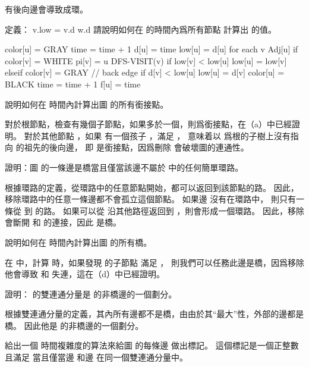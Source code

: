 \startANSWER
有後向邊會導致成環。
\stopANSWER

\startigBase[continue]\startitem
定義：
\startformula
v.low = \min \startcases
\NC v.d \MC \NR
\NC w.d \MC{}\NR
\stopcases
\stopformula
請說明如何在  的時間內爲所有節點  計算出  的值。
\stopitem\stopigBase

\startANSWER
{}
\startCLRS
color[u] = GRAY
time = time + 1
d[u] = time
low[u] = d[u]
for each v Adj[u]
	if color[v] = WHITE
		pi[v] = u
		DFS-VISIT(v)
		if low[v] < low[u]
			low[u] = low[v]
	elseif color[v] = GRAY		// back edge
		if d[v] < low[u]
			low[u] = d[v]
color[u] = BLACK
time = time + 1
f[u] = time
\stopCLRS
\stopANSWER

\startigBase[continue]\startitem
說明如何在  時間內計算出圖  的所有銜接點。
\stopitem\stopigBase

\startANSWER
對於根節點，檢查有幾個子節點，如果多於一個，則爲銜接點，在（a）中已經證明。
對於其他節點 ，如果  有一個孩子 ，滿足 ，
意味着以  爲根的子樹上沒有指向  的祖先的後向邊，
即  是銜接點，因爲刪除  會破壞圖的連通性。
\stopANSWER

\startigBase[continue]\startitem
證明：圖  的一條邊是橋當且僅當該邊不屬於  中的任何簡單環路。
\stopitem\stopigBase

\startANSWER
根據環路的定義，從環路中的任意節點開始，都可以返回到該節點的路。
因此，移除環路中的任意一條邊都不會孤立這個節點。
如果邊  沒有在環路中，
則只有一條從  到  的路。
如果可以從  沿其他路徑返回到 ，則會形成一個環路。
因此，移除  會斷開  和  的連接，因此  是橋。
\stopANSWER

\startigBase[continue]\startitem
說明如何在  時間內計算出圖  的所有橋。
\stopitem\stopigBase

\startANSWER
在  中，計算  時，如果發現  的子節點  滿足 ，
則我們可以任務此邊是橋，因爲移除他會導致  和  失連，這在（d）中已經證明。
\stopANSWER

\startigBase[continue]\startitem
證明：  的雙連通分量是  的非橋邊的一個劃分。
\stopitem\stopigBase

\startANSWER
根據雙連通分量的定義，其內所有邊都不是橋，由由於其“最大”性，外部的邊都是橋。
因此他是  的非橋邊的一個劃分。
\stopANSWER

\startigBase[continue]\startitem
給出一個  時間複雜度的算法來給圖  的每條邊  做出標記。
這個標記是一個正整數  且滿足  當且僅當邊  和邊  在同一個雙連通分量中。
\stopitem\stopigBase

